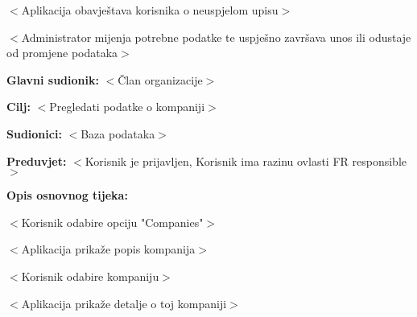 \begin{packed_item}
\begin{packed_item}
							\item[] \begin{packed_enum}

								\item $<$Aplikacija obavještava korisnika o neuspjelom upisu$>$
								\item $<$Administrator mijenja potrebne podatke te uspješno završava unos ili
								odustaje od promjene podataka$>$

							\end{packed_enum}

						\end{packed_item}
						
					\end{packed_item}

					\noindent {}
					\begin{packed_item}

						\item \textbf{Glavni sudionik:} $<$Član organizacije$>$
						\item \textbf{Cilj:} $<$Pregledati podatke o kompaniji$>$
						\item \textbf{Sudionici:} $<$Baza podataka$>$
						\item \textbf{Preduvjet:} $<$Korisnik je prijavljen, Korisnik ima razinu ovlasti FR responsible$>$
						\item \textbf{Opis osnovnog tijeka:}

						\item[] \begin{packed_enum}

							\item $<$Korisnik odabire opciju "Companies"$>$
							\item $<$Aplikacija prikaže popis kompanija$>$
							\item $<$Korisnik odabire kompaniju$>$
							\item $<$Aplikacija prikaže detalje o toj kompaniji$>$
						\end{packed_enum}
					\end{packed_item}


